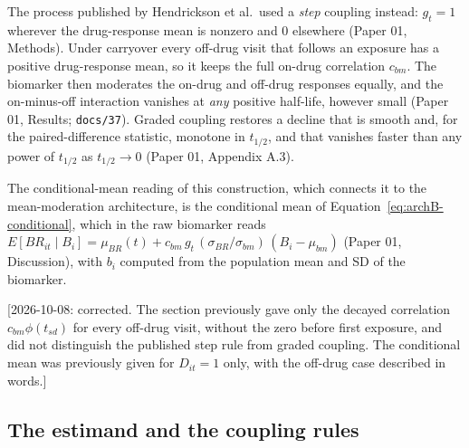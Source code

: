 \documentclass[11pt]{article}
\newcommand{\note}[1]{\textcolor{blue!60!black}{\small [#1]}}
\newcommand{\code}[1]{\texttt{#1}}
\begin{document}
The process published by Hendrickson et al.\ used a \emph{step}
coupling instead: $g_t = 1$ wherever the drug-response mean is nonzero
and $0$ elsewhere (Paper 01, Methods). Under carryover every off-drug
visit that follows an exposure has a positive drug-response mean, so
it keeps the full on-drug correlation $c_{bm}$. The biomarker then
moderates the on-drug and off-drug responses equally, and the
on-minus-off interaction vanishes at \emph{any} positive half-life,
however small (Paper 01, Results; \code{docs/37}). Graded coupling
restores a decline that is smooth and, for the paired-difference
statistic, monotone in $t_{1/2}$, and that vanishes faster than any
power of $t_{1/2}$ as $t_{1/2} \to 0$ (Paper 01, Appendix A.3).

The conditional-mean reading of this construction, which connects it
to the mean-moderation architecture, is the conditional mean of
Equation~\eqref{eq:archB-conditional}, which in the raw biomarker reads
$E[BR_{it} \mid B_i] = \mu_{BR}(t) + c_{bm}\, g_t\,
(\sigma_{BR}/\sigma_{bm})\,(B_i - \mu_{bm})$ (Paper 01, Discussion), with
$b_i$ computed from the population mean and SD of the biomarker.

\note{2026-10-08: corrected. The section previously gave only the
decayed correlation $c_{bm}\phi(t_{sd})$ for every off-drug visit,
without the zero before first exposure, and did not distinguish the
published step rule from graded coupling.
The conditional mean was previously given for
$D_{it}=1$ only, with the off-drug case described in words.}

\subsection{The estimand and the coupling rules}
\label{sec:cg-estimand}
\end{document}
